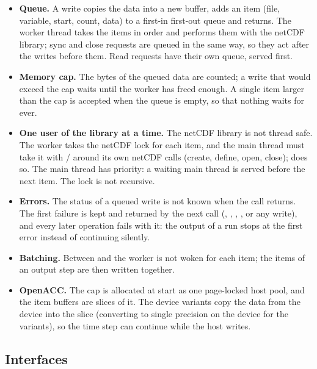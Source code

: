 \begin{itemize}
  \item \textbf{Queue.} A write copies the data into a new buffer, adds an
        item (file, variable, start, count, data) to a first-in first-out
        queue and returns. The worker thread takes the items in order and
        performs them with the netCDF library; sync and close requests are
        queued in the same way, so they act after the writes before them.
        Read requests have their own queue, served first.
  \item \textbf{Memory cap.} The bytes of the queued data are counted; a
        write that would exceed the cap waits until the worker has freed
        enough. A single item larger than the cap is accepted when the
        queue is empty, so that nothing waits for ever.
  \item \textbf{One user of the library at a time.} The netCDF library is
        not thread safe. The worker takes the netCDF lock for each item,
        and the main thread must take it with  /
         around its own netCDF calls (create,
        define, open, close);  does so. The main thread
        has priority: a waiting main thread is served before the next item.
        The lock is not recursive.
  \item \textbf{Errors.} The status of a queued write is not known when the
        call returns. The first failure is kept and returned by the next
        call (, , , ,
        or any write), and every later operation fails with it: the output
        of a run stops at the first error instead of continuing silently.
  \item \textbf{Batching.} Between 
        and  the worker is not woken for each item; the items of
        an output step are then written together.
  \item \textbf{OpenACC.} The cap is allocated at start as one page-locked
        host pool, and the item buffers are slices of it. The device
        variants copy the data from the device into the slice (converting
         to single precision on the device for the 
        variants), so the time step can continue while the host writes.
\end{itemize}

\subsection{Interfaces}

